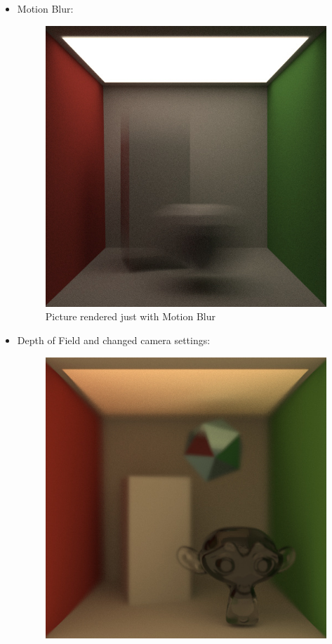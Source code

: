 \documentclass[11pt,a4paper]{article}
\begin{document}
\begin{itemize}
\item
Motion Blur:
\begin{figure}[H]
\begin{center}
\includegraphics[scale=0.4]{images/motionBlur560spp}
\caption[Picture showing Motion Blur]{Picture rendered just with Motion Blur}
\label{fig:2}
\end{center}
\end{figure}
\newpage
\item
Depth of Field and changed camera settings:
\begin{figure}[H]
\begin{center}
\begin{minipage}[b]{7.5 cm}
\includegraphics[scale=0.4]{images/DepthOfFieldFront1096spp}

\end{minipage}
\end{center}
\end{figure}
\end{itemize}
\end{document}

